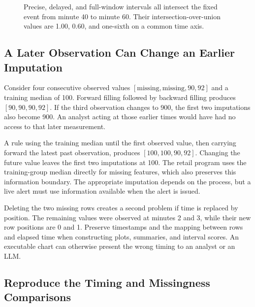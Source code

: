 \begin{figure}[htbp]
\centering

\caption{Precise, delayed, and full-window intervals all intersect the fixed event from minute 40 to minute 60. Their intersection-over-union values are 1.00, 0.60, and one-sixth on a common time axis.}\label{fig:M07_anomaly_intervals}
\end{figure}

\hypertarget{M07-a-later-observation-can-change-an-earlier-imputation}{%
\subsection{A Later Observation Can Change an Earlier
Imputation}\label{M07-a-later-observation-can-change-an-earlier-imputation}}

\noindent \noindent Consider four consecutive observed values
\([\text{missing},\text{missing},90,92]\) and a training median of 100.
Forward filling followed by backward filling produces \([90,90,90,92]\).
If the third observation changes to 900, the first two imputations also
become 900. An analyst acting at those earlier times would have had no
access to that later measurement.

A rule using the training median until the first observed value, then
carrying forward the latest past observation, produces
\([100,100,90,92]\). Changing the future value leaves the first two
imputations at 100. The retail program uses the training-group median
directly for missing features, which also preserves this information
boundary. The appropriate imputation depends on the process, but a live
alert must use information available when the alert is issued.

Deleting the two missing rows creates a second problem if time is
replaced by position. The remaining values were observed at minutes 2
and 3, while their new row positions are 0 and 1. Preserve timestamps
and the mapping between rows and elapsed time when constructing plots,
summaries, and interval scores. An executable chart can otherwise
present the wrong timing to an analyst or an LLM.

\hypertarget{M07-reproduce-the-timing-and-missingness-comparisons}{%
\subsection{Reproduce the Timing and Missingness
Comparisons}\label{M07-reproduce-the-timing-and-missingness-comparisons}}

